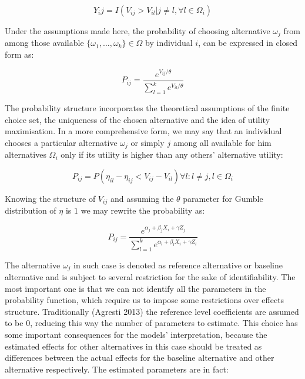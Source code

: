 \documentclass[11pt,]{article}
\begin{document}
\begin{equation}
Y_ij = I(V_{ij} > V_{il} | j \neq l, \forall l \in \Omega_i)
\end{equation}

Under the assumptions made here, the probability of choosing alternative
\(\omega_j\) from among those available
\(\{\omega_1, \dots, \omega_k\} \in \Omega\) by individual \(i\), can be
expressed in closed form as:

\begin{equation}
P_{ij} = \frac{
    e^{V_{ij} / \theta}
}{
    \sum_{l = 1}^{k} e^{V_{il} / \theta}
}
\end{equation}

The probability structure incorporates the theoretical assumptions of
the finite choice set, the uniqueness of the chosen alternative and the
idea of utility maximisation. In a more comprehensive form, we may say
that an individual chooses a particular alternative \(\omega_j\) or
simply \(j\) among all available for him alternatives \(\Omega_i\) only
if its utility is higher than any others' alternative utility:

\begin{equation}
P_{ij} = P(\eta_{il} - \eta_{ij} < V_{ij} - V_{il}) 
    \forall l : l \neq j, l \in \Omega_i
\end{equation}

Knowing the structure of \(V_{ij}\) and assuming the \(\theta\)
parameter for Gumble distribution of \(\eta\) is \(1\) we may rewrite
the probability as:

\begin{equation}
P_{ij} = \frac{
    e^{\alpha_j + \beta_j X_i + \gamma Z_j}
}{
    \sum_{l = 1}^{k} e^{\alpha_l + \beta_l X_i + \gamma Z_l}
}
\end{equation}

The alternative \(\omega_j\) in such case is denoted as reference
alternative or baseline alternative and is subject to several
restriction for the sake of identifiability. The most important one is
that we can not identify all the parameters in the probability function,
which require us to impose some restrictions over effects structure.
Traditionally (Agresti 2013) the reference level coefficients are
assumed to be 0, reducing this way the number of parameters to estimate.
This choice has some important consequences for the models'
interpretation, because the estimated effects for other alternatives in
this case should be treated as differences between the actual effects
for the baseline alternative and other alternative respectively. The
estimated parameters are in fact:
\end{document}
